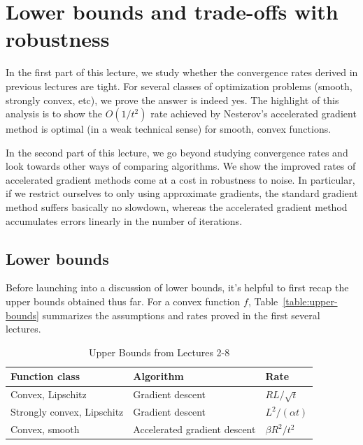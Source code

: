 \section{Lower bounds and trade-offs with robustness}

In the first part of this lecture, we study whether the convergence rates
derived in previous lectures are tight. For several classes of optimization
problems (smooth, strongly convex, etc), we prove the
answer is indeed yes. The highlight of this analysis is to show the $O(1/t^2)$
rate achieved by Nesterov's accelerated gradient method is optimal (in a weak
technical sense) for smooth, convex functions. 

In the second part of this lecture, we go beyond studying convergence rates and
look towards other ways of comparing algorithms. We show the improved rates of
accelerated gradient methods come at a cost in robustness to noise. In
particular, if we restrict ourselves to only using approximate gradients, the
standard gradient method suffers basically no slowdown, whereas the accelerated
gradient method accumulates errors linearly in the number of iterations.

\subsection{Lower bounds}
Before launching into a discussion of lower bounds, it's helpful to first recap
the upper bounds obtained thus far. For a convex function $f$,
Table~\eqref{table:upper-bounds} summarizes the assumptions and rates proved in
the first several lectures. 
~
\begin{table}[]
\centering
\caption{Upper Bounds from Lectures 2-8}
\label{table:upper-bounds}
\begin{tabular}{|l|l|l|}
\hline
Function class                        & Algorithm                    & Rate                                            \\ \hline
Convex, Lipschitz          & Gradient descent             & $RL / \sqrt{t}$                               \\ \hline
Strongly convex, Lipschitz & Gradient descent             & $L^2 / (\alpha t)$                \\ \hline
Convex, smooth             & Accelerated gradient descent & $\beta R^2 / t^2$ \\ \hline
\end{tabular}
\end{table}  

